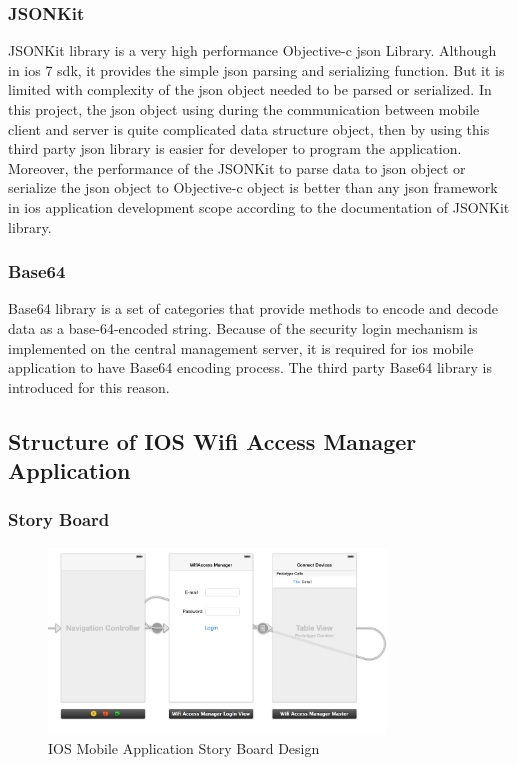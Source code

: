 \subsubsection{JSONKit}
\par JSONKit\cite{jsonkit} library is a very high performance Objective-c \gls{json} Library. Although in \gls{ios} 7 \gls{sdk}, it provides the simple \gls{json} parsing and serializing function. But it is limited with complexity of the \gls{json} object needed to be parsed or serialized. In this project, the \gls{json} object using during the communication between mobile client and server is quite complicated data structure object, then by using this third party \gls{json} library is easier for developer to program the application. Moreover, the performance of the JSONKit to parse data to \gls{json} object or serialize the \gls{json} object to Objective-c object is better than any \gls{json} framework in \gls{ios} application development scope according to the documentation of JSONKit library.

\subsubsection{Base64}
\par Base64\cite{base64lib} library is a set of categories that provide methods to encode and decode data as a base-64-encoded string. Because of the security login mechanism is implemented on the central management server, it is required for \gls{ios} mobile application to have Base64 encoding process. The third party Base64 library is introduced for this reason.

\subsection{Structure of IOS Wifi Access Manager Application}

\subsubsection{Story Board}

\begin{figure}
	\centering
    	\includegraphics[width=0.80\textwidth,natwidth=610,natheight=642]{figs/ios_app_storyboard.png}
  	\caption{IOS Mobile Application Story Board Design}
  	\label{fig:ios_storyboard}
\end{figure}

